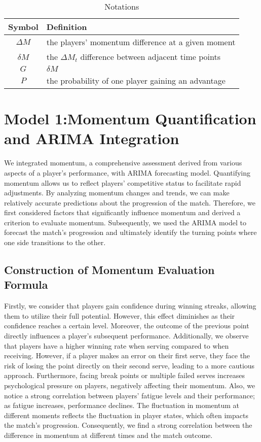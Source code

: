 \documentclass[12pt]{article}
\begin{document}
\begin{table}[!htbp]
\begin{center}
\caption{Notations}
\begin{tabular}{cl}
	\toprule
	\multicolumn{1}{m{3cm}}{\centering \textbf{Symbol}}
	&\multicolumn{1}{m{8cm}}{\centering \textbf {Definition}}\\
	\midrule
	$\Delta M$&the players' momentum difference at a given moment\\
	$\delta M$&the $\Delta M_t$ difference between adjacent time points\\
	$ G $ & $ \delta M $\\
	$ P $ & the probability of one player gaining an advantage \\
	\bottomrule
\end{tabular}\label{tb:notation}
\end{center}
\end{table}

\section{Model 1:Momentum Quantification and ARIMA Integration}

We integrated momentum, a comprehensive assessment derived from various aspects of a player's performance, with ARIMA forecasting model. Quantifying momentum allows us to reflect players' competitive status to facilitate rapid adjustments. By analyzing momentum changes and trends, we can make relatively accurate predictions about the progression of the match. Therefore, we first considered factors that significantly influence momentum and derived a criterion to evaluate momentum. Subsequently, we used the ARIMA model to forecast the match's progression and ultimately identify the turning points where one side transitions to the other.

\subsection{Construction of Momentum Evaluation Formula}

Firstly, we consider that players gain confidence during winning streaks, allowing them to utilize their full potential. However, this effect diminishes as their confidence reaches a certain level. Moreover, the outcome of the previous point directly influences a player's subsequent performance. Additionally, we observe that players have a higher winning rate when serving compared to when receiving. However, if a player makes an error on their first serve, they face the risk of losing the point directly on their second serve, leading to a more cautious approach. Furthermore, facing break points or multiple failed serves increases psychological pressure on players, negatively affecting their momentum. Also, we notice a strong correlation between players' fatigue levels and their performance; as fatigue increases, performance declines. The fluctuation in momentum at different moments reflects the fluctuation in player states, which often impacts the match's progression. Consequently, we find a strong correlation between the difference in momentum at different times and the match outcome.
\end{document}
